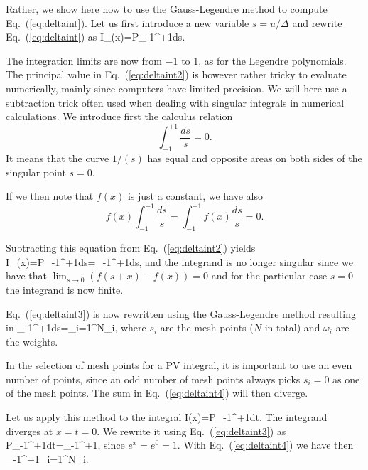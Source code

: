 Rather, we show here how to use the Gauss-Legendre method
to compute Eq.~(\ref{eq:deltaint}). 
Let us first introduce a new variable $s=u/\Delta$ and rewrite
Eq.~(\ref{eq:deltaint}) as   
\be
I_{\Delta}(x)={\cal P}\int_{-1}^{+1}ds.
\label{eq:deltaint2}
\ee

The integration limits are now from $-1$ to $1$, as for the Legendre
polynomials.
The principal value in Eq.\ (\ref{eq:deltaint2}) is however rather tricky
to evaluate numerically, mainly since computers have limited
precision. We will here use a subtraction trick often used
when dealing with singular integrals in numerical calculations.
We introduce first the calculus relation
\[
  \int_{-1}^{+1} \frac{ds}{s} =0.
\]
It means that the curve $1/(s)$ has equal and opposite
areas on both sides of the singular point $s=0$. 

If we then note that $f(x)$ is just a constant, we have also
\[
  f(x)\int_{-1}^{+1} \frac{ds}{s}=\int_{-1}^{+1}f(x) \frac{ds}{s} =0.
\]

Subtracting this equation from 
Eq.\ (\ref{eq:deltaint2}) yields
\be
I_{\Delta}(x)={\cal P}\int_{-1}^{+1}ds=\int_{-1}^{+1}ds,
\label{eq:deltaint3}
\ee
and the integrand is no longer singular since we have that 
$\lim_{s \rightarrow 0} (f(s+x) -f(x))=0$ and for the particular case
$s=0$ the integrand 
is now finite.  

Eq.\ (\ref{eq:deltaint3}) is now rewritten using the Gauss-Legendre
method resulting in
\be
\int_{-1}^{+1}ds=\sum_{i=1}^{N}\omega_i,
\label{eq:deltaint4}
\ee
where $s_i$ are the mesh points ($N$ in total) and $\omega_i$ are the weights.

In the selection of mesh points for  a PV integral, it is important
to use an even number of points, since an odd number of mesh
points always picks $s_i=0$ as one of the mesh points. The sum in
Eq.~(\ref{eq:deltaint4}) will then diverge. 


Let us apply this method to the integral
\be
I(x)={\cal P}\int_{-1}^{+1}dt.
\label{eq:deltaint5}
\ee
The integrand diverges at $x=t=0$. We
rewrite it using Eq.~(\ref{eq:deltaint3}) as
\be
{\cal P}\int_{-1}^{+1}dt=\int_{-1}^{+1},
\label{eq:deltaint6}
\ee
since $e^x=e^0=1$. With Eq.~(\ref{eq:deltaint4}) we have then
\be
\int_{-1}^{+1}\approx \sum_{i=1}^{N}\omega_i.
\label{eq:deltaint7}
\ee

